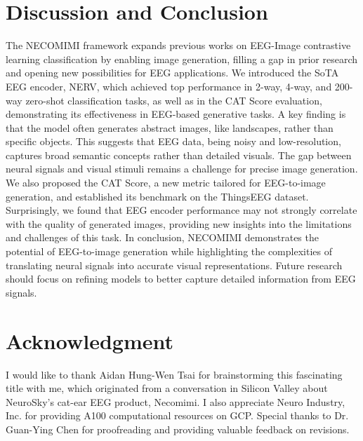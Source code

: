 \documentclass{article}
\begin{document}
\section{Discussion and Conclusion}
The NECOMIMI framework expands previous works on EEG-Image contrastive learning classification by enabling image generation, filling a gap in prior research and opening new possibilities for EEG applications. We introduced the SoTA EEG encoder, NERV, which achieved top performance in 2-way, 4-way, and 200-way zero-shot classification tasks, as well as in the CAT Score evaluation, demonstrating its effectiveness in EEG-based generative tasks. A key finding is that the model often generates abstract images, like landscapes, rather than specific objects. This suggests that EEG data, being noisy and low-resolution, captures broad semantic concepts rather than detailed visuals. The gap between neural signals and visual stimuli remains a challenge for precise image generation. We also proposed the CAT Score, a new metric tailored for EEG-to-image generation, and established its benchmark on the ThingsEEG dataset. Surprisingly, we found that EEG encoder performance may not strongly correlate with the quality of generated images, providing new insights into the limitations and challenges of this task. In conclusion, NECOMIMI demonstrates the potential of EEG-to-image generation while highlighting the complexities of translating neural signals into accurate visual representations. Future research should focus on refining models to better capture detailed information from EEG signals.


\section*{Acknowledgment}

 I would like to thank Aidan Hung-Wen Tsai for brainstorming this fascinating title with me, which originated from a conversation in Silicon Valley about NeuroSky's cat-ear EEG product, Necomimi. I also appreciate Neuro Industry, Inc. for providing A100 computational resources on GCP. Special thanks to Dr. Guan-Ying Chen for proofreading and providing valuable feedback on revisions.


 



\end{document}
